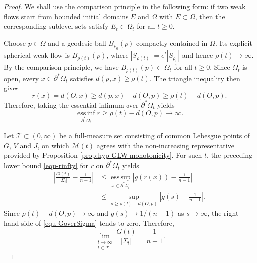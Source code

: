 \documentclass[11pt,reqno]{amsart}
\numberwithin{equation}{section}
\theoremstyle{definition}
\begin{document}
\begin{proof}
We shall use the comparison principle \cite[Theorem~2.2]{HI2001} in the following form: if two weak flows start from bounded initial domains $E$ and $\Omega$ with $E\subset \Omega$, then the corresponding sublevel sets satisfy $E_t\subset \Omega_t$ for all $t\geq0$. 

Choose $p\in\Omega$ and a geodesic ball $B_{\rho_0}(p)$ compactly
contained in $\Omega$.  Its explicit spherical weak flow is
$B_{\rho(t)}(p)$, where $|S_{\rho(t)}|=e^t|S_{\rho_0}|$ and hence
$\rho(t)\to\infty$. By the comparison principle, we have $B_{\rho(t)}(p)\subset\Omega_t$ for all $t\geq 0$. Since $\Omega_t$ is open, every $x\in\partial^*\Omega_t$ satisfies
$d(p,x)\geq\rho(t)$. The triangle inequality then gives
\begin{equation*}
r(x)=d(O,x)\geq d(p,x)-d(O,p)\geq\rho(t)-d(O,p).
\end{equation*}
Therefore, taking the essential infimum over $\partial^*\Omega_t$ yields
\begin{equation}
    \operatorname*{ess\,inf}_{\partial^*\Omega_t}r
    \geq\rho(t)-d(O,p)
    \longrightarrow\infty.
    \label{equ-rinfty}
\end{equation}


Let $\mathcal T\subset(0,\infty)$ be a full-measure set consisting
of common Lebesgue points of $G$, $V$ and $J$, on which $\mathcal M(t)$ agrees with the non-increasing representative
provided by Proposition \ref{prop:hyp-GLW-monotonicity}. For such $t$, the preceding lower bound \eqref{equ-rinfty} for $r$ on $\partial^*\Omega_t$ yields
\begin{align}
\left|\frac{G(t)}{|\Sigma_t|}-\frac1{n-1}
\right|&\leq\operatorname*{ess\,sup}_{x\in\partial^*\Omega_t}
\left|g(r(x))-\frac{1}{n-1}\right|\nonumber\\
&\leq\sup_{s\geq\rho(t)-d(O,p)}
\left|g(s)-\frac{1}{n-1}\right|.  \label{equ-GoverSigma}
\end{align}
Since $\rho(t)-d(O,p)\to\infty$ and $g(s)\to1/(n-1)$ as $s\to\infty$, the right-hand side of \eqref{equ-GoverSigma} tends to zero. Therefore,
\begin{equation}
    \lim_{\substack{t\to\infty\\ t\in\mathcal T}}
    \frac{G(t)}{|\Sigma_t|}=\frac{1}{n-1}.
    \label{s4.lim}
\end{equation}


\end{proof}
\end{document}
